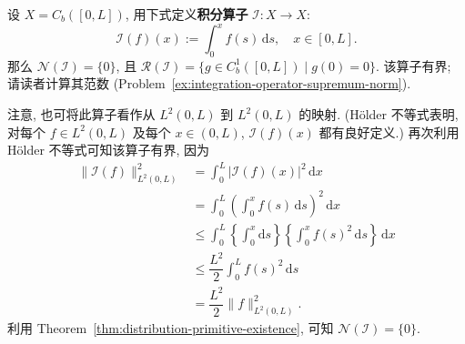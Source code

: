\begin{Example}
\label{ex:integration-operator-fixed-lower-endpoint}
设 $X=C_b([0,L])$, 用下式定义\textbf{积分算子} $\mathcal{I}:X\to X$:
\begin{equation}\label{eq:integration-operator-fixed-lower-endpoint}
\mathcal{I}(f)(x):=\int_0^xf(s)\,\mathrm{d}s,\quad x\in[0,L].
\end{equation}
那么 $\mathcal{N}(\mathcal{I})=\{0\}$, 且 $\mathcal{R}(\mathcal{I})=\{g\in C_b^1([0,L])\mid g(0)=0\}$. 该算子有界; 请读者计算其范数 (Problem~\ref{ex:integration-operator-supremum-norm}).

注意, 也可将此算子看作从 $L^2(0,L)$ 到 $L^2(0,L)$ 的映射. (Hölder 不等式表明, 对每个 $f\in L^2(0,L)$ 及每个 $x\in(0,L)$, $\mathcal{I}(f)(x)$ 都有良好定义.) 再次利用 Hölder 不等式可知该算子有界, 因为\[\begin{aligned}
\|\mathcal{I}(f)\|_{L^2(0,L)}^2&=\int_0^L|\mathcal{I}(f)(x)|^2\,\mathrm{d}x\\
&=\int_0^L\left(\int_0^xf(s)\,\mathrm{d}s\right)^2\,\mathrm{d}x\\
&\leq\int_0^L\left\{\int_0^x\mathrm{d}s\right\}\left\{\int_0^xf(s)^2\,\mathrm{d}s\right\}\,\mathrm{d}x\\
&\leq\dfrac{L^2}{2}\int_0^Lf(s)^2\,\mathrm{d}s\\
&=\dfrac{L^2}{2}\|f\|_{L^2(0,L)}^2.
\end{aligned}\]利用 Theorem~\ref{thm:distribution-primitive-existence}, 可知 $\mathcal{N}(\mathcal{I})=\{0\}$.
\end{Example}

